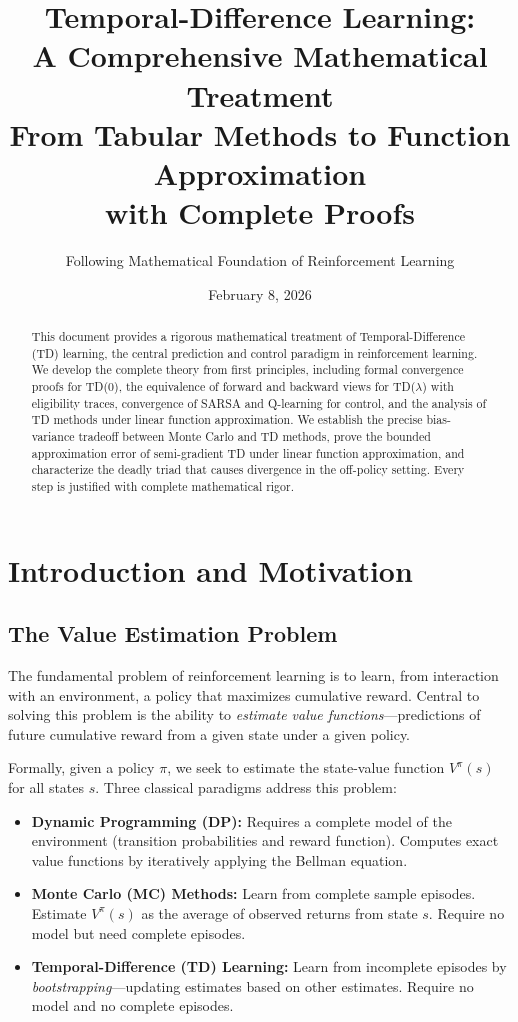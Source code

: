 \documentclass[11pt,a4paper]{article}
\title{\textbf{Temporal-Difference Learning:\\A Comprehensive Mathematical Treatment}\\[10pt]
\large From Tabular Methods to Function Approximation\\with Complete Proofs}
\author{Following Mathematical Foundation of Reinforcement Learning}
\date{February 8, 2026}
\theoremstyle{definition}
\theoremstyle{plain}
\theoremstyle{remark}
\begin{document}
\maketitle

\begin{abstract}
This document provides a rigorous mathematical treatment of Temporal-Difference (TD) learning, the central prediction and control paradigm in reinforcement learning. We develop the complete theory from first principles, including formal convergence proofs for TD(0), the equivalence of forward and backward views for TD($\lambda$) with eligibility traces, convergence of SARSA and Q-learning for control, and the analysis of TD methods under linear function approximation. We establish the precise bias-variance tradeoff between Monte Carlo and TD methods, prove the bounded approximation error of semi-gradient TD under linear function approximation, and characterize the deadly triad that causes divergence in the off-policy setting. Every step is justified with complete mathematical rigor.
\end{abstract}

\tableofcontents
\newpage

\section{Introduction and Motivation}
\label{sec:introduction}

\subsection{The Value Estimation Problem}
\label{subsec:value_estimation}

The fundamental problem of reinforcement learning is to learn, from interaction with an environment, a policy that maximizes cumulative reward. Central to solving this problem is the ability to \emph{estimate value functions}---predictions of future cumulative reward from a given state under a given policy.

Formally, given a policy $\pi$, we seek to estimate the state-value function $V^\pi(s)$ for all states $s$. Three classical paradigms address this problem:
\begin{itemize}[nosep]
    \item \textbf{Dynamic Programming (DP):} Requires a complete model of the environment (transition probabilities and reward function). Computes exact value functions by iteratively applying the Bellman equation.
    \item \textbf{Monte Carlo (MC) Methods:} Learn from complete sample episodes. Estimate $V^\pi(s)$ as the average of observed returns from state $s$. Require no model but need complete episodes.
    \item \textbf{Temporal-Difference (TD) Learning:} Learn from incomplete episodes by \emph{bootstrapping}---updating estimates based on other estimates. Require no model and no complete episodes.
\end{itemize}
\end{document}
